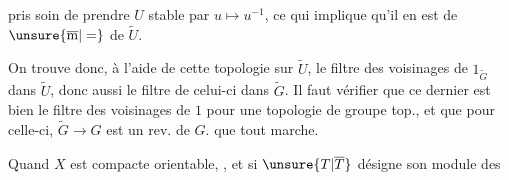  pris soin de prendre $U$ stable par $u\mapsto u^{-1}$, ce qui implique qu'il en est de $\unsure{\overline{\mathrm m}|=}$ de $\widetilde U$.

On trouve donc, à l'aide de cette topologie sur $\widetilde U$,  le filtre des voisinages de $1_{\widetilde G}$ dans $\widetilde U$, donc aussi le filtre  de celui-ci dans $\widetilde G$. Il faut vérifier que ce dernier est bien le filtre des voisinages de $1$ pour une topologie de groupe top., et que pour celle-ci, $\widetilde G\to G$ est un rev. de $G$.  que tout marche.

Quand $X$ est  compacte orientable, , et  si $\unsure{T|\overline T}$ désigne son module des




